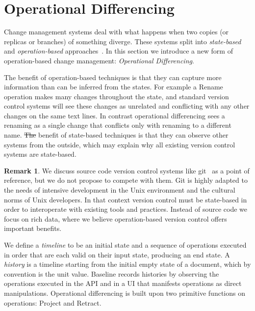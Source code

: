 \documentclass[english,submission]{programming}
\theoremstyle{definition}
\newtheorem*{remark}{Remark}
\providecommand{\DIFadd}[1]{{\protect\color{blue}\uwave{#1}}} %
\providecommand{\DIFdel}[1]{{\protect\color{red}\sout{#1}}} %
\providecommand{\DIFaddbegin}{} %
\providecommand{\DIFaddend}{} %
\providecommand{\DIFdelbegin}{} %
\providecommand{\DIFdelend}{} %
\begin{document}
\section{Operational Differencing}

Change management systems deal with what happens when two copies (or replicas or branches) of something diverge.
These systems split into \textit{state-based} and \textit{operation-based} approaches~\cite{diff3, Shapiro11}.
In this section we introduce a new form of operation-based change management: \textit{Operational Differencing}.

The benefit of operation-based techniques is that they can capture more information than can be inferred from the states.
For example a \textsf{Rename} operation makes many changes throughout the state, and standard version control systems will see these changes as unrelated and conflicting with any other changes on the same text lines. In contrast operational differencing sees a renaming as a single change that conflicts only with renaming to a different name.
\DIFdelbegin \DIFdel{The }\DIFdelend \DIFaddbegin \DIFadd{On the other hand, the }\DIFaddend benefit of state-based techniques is that they can observe other systems from the outside, which may explain why all existing version control systems are state-based.

\begin{remark}
We discuss source code version control systems like git~\cite{ProGit} as a point of reference, but we do not propose to compete with them. Git is highly adapted to the needs of intensive development in the Unix environment and the cultural norms of Unix developers. In that context version control must be state-based in order to interoperate with existing tools and practices. Instead of source code we focus on rich data, where we believe operation-based version control offers important benefits.
\end{remark}

We define a \textit{timeline} to be an initial state and a sequence of operations executed in order that are each valid on their input state, producing an end state.
A \textit{history} is a timeline starting from the initial empty state of a document, which by convention is the unit value.
Baseline records histories by observing the operations executed in the API and in a UI that manifests operations as direct manipulations. Operational differencing is built upon two primitive functions on operations: \textsf{Project} and \textsf{Retract}.
\end{document}
